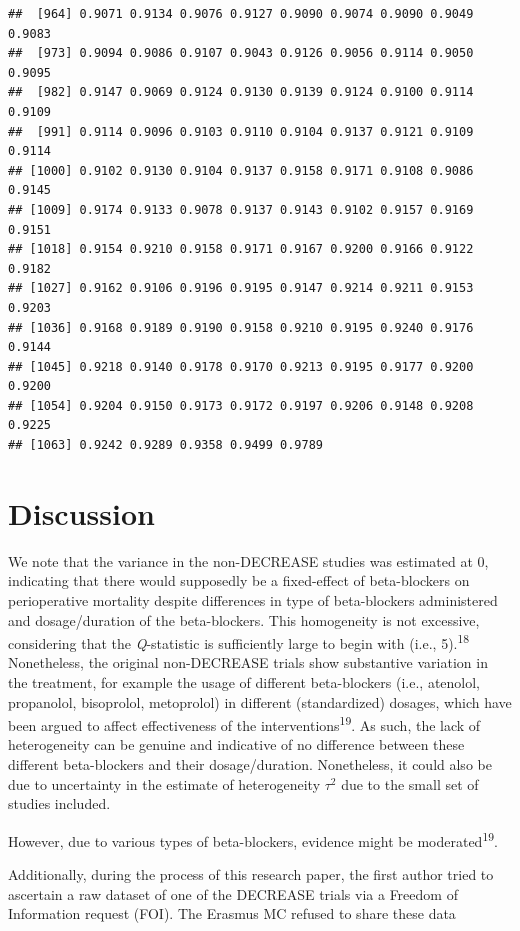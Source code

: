 \documentclass[]{article}
\begin{document}
\begin{verbatim}
##  [964] 0.9071 0.9134 0.9076 0.9127 0.9090 0.9074 0.9090 0.9049 0.9083
##  [973] 0.9094 0.9086 0.9107 0.9043 0.9126 0.9056 0.9114 0.9050 0.9095
##  [982] 0.9147 0.9069 0.9124 0.9130 0.9139 0.9124 0.9100 0.9114 0.9109
##  [991] 0.9114 0.9096 0.9103 0.9110 0.9104 0.9137 0.9121 0.9109 0.9114
## [1000] 0.9102 0.9130 0.9104 0.9137 0.9158 0.9171 0.9108 0.9086 0.9145
## [1009] 0.9174 0.9133 0.9078 0.9137 0.9143 0.9102 0.9157 0.9169 0.9151
## [1018] 0.9154 0.9210 0.9158 0.9171 0.9167 0.9200 0.9166 0.9122 0.9182
## [1027] 0.9162 0.9106 0.9196 0.9195 0.9147 0.9214 0.9211 0.9153 0.9203
## [1036] 0.9168 0.9189 0.9190 0.9158 0.9210 0.9195 0.9240 0.9176 0.9144
## [1045] 0.9218 0.9140 0.9178 0.9170 0.9213 0.9195 0.9177 0.9200 0.9200
## [1054] 0.9204 0.9150 0.9173 0.9172 0.9197 0.9206 0.9148 0.9208 0.9225
## [1063] 0.9242 0.9289 0.9358 0.9499 0.9789
\end{verbatim}

\section{Discussion}\label{discussion}

We note that the variance in the non-DECREASE studies was estimated at
0, indicating that there would supposedly be a fixed-effect of
beta-blockers on perioperative mortality despite differences in type of
beta-blockers administered and dosage/duration of the beta-blockers.
This homogeneity is not excessive, considering that the
\emph{Q}-statistic is sufficiently large to begin with (i.e.,
5).\textsuperscript{18} Nonetheless, the original non-DECREASE trials
show substantive variation in the treatment, for example the usage of
different beta-blockers (i.e., atenolol, propanolol, bisoprolol,
metoprolol) in different (standardized) dosages, which have been argued
to affect effectiveness of the interventions\textsuperscript{19}. As
such, the lack of heterogeneity can be genuine and indicative of no
difference between these different beta-blockers and their
dosage/duration. Nonetheless, it could also be due to uncertainty in the
estimate of heterogeneity \(\tau^2\) due to the small set of studies
included.

However, due to various types of beta-blockers, evidence might be
moderated\textsuperscript{19}.

Additionally, during the process of this research paper, the first
author tried to ascertain a raw dataset of one of the DECREASE trials
via a Freedom of Information request (FOI). The Erasmus MC refused to
share these data
\end{document}

